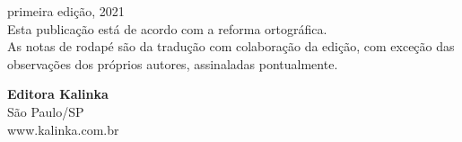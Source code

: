 {\begin{flushright}
primeira edição, 2021\\[20pt]

Esta publicação está de acordo com a reforma ortográfica.\\[6pt]

As notas de rodapé são da tradução com colaboração da edição, com exceção das observações dos próprios autores, assinaladas pontualmente.\\[6pt]
\end{flushright}
\vspace*{\fill}

\vfill


\begin{flushright}
\textbf{Editora Kalinka}\\
São Paulo/SP\\
www.kalinka.com.br
\end{flushright}

\endgroup
